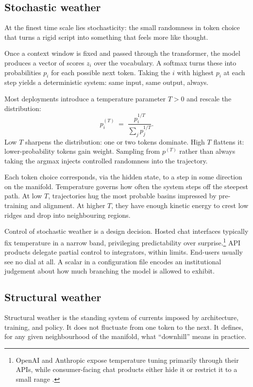 \documentclass[12pt,a4paper]{article}
\begin{document}
\subsection{Stochastic weather}

At the finest time scale lies stochasticity: the small randomness in token choice that turns a rigid script into something that feels more like thought.

Once a context window is fixed and passed through the transformer, the model produces a vector of scores $z_i$ over the vocabulary. A softmax turns these into probabilities $p_i$ for each possible next token. Taking the $i$ with highest $p_i$ at each step yields a deterministic system: same input, same output, always.

Most deployments introduce a temperature parameter $T > 0$ and rescale the distribution:
\[
p_i^{(T)} \;=\; \frac{p_i^{1/T}}{\sum_j p_j^{1/T}}.
\]
Low $T$ sharpens the distribution: one or two tokens dominate. High $T$ flattens it: lower-probability tokens gain weight. Sampling from $p^{(T)}$ rather than always taking the argmax injects controlled randomness into the trajectory.

Each token choice corresponds, via the hidden state, to a step in some direction on the manifold. Temperature governs how often the system steps off the steepest path. At low $T$, trajectories hug the most probable basins impressed by pre-training and alignment. At higher $T$, they have enough kinetic energy to crest low ridges and drop into neighbouring regions.

Control of stochastic weather is a design decision. Hosted chat interfaces typically fix temperature in a narrow band, privileging predictability over surprise.\footnote{OpenAI and Anthropic expose temperature tuning primarily through their APIs, while consumer-facing chat products either hide it or restrict it to a small range \cite{openai_api,anthropic_docs}.} API products delegate partial control to integrators, within limits. End-users usually see no dial at all. A scalar in a configuration file encodes an institutional judgement about how much branching the model is allowed to exhibit.

\subsection{Structural weather}

Structural weather is the standing system of currents imposed by architecture, training, and policy. It does not fluctuate from one token to the next. It defines, for any given neighbourhood of the manifold, what ``downhill'' means in practice.
\end{document}
